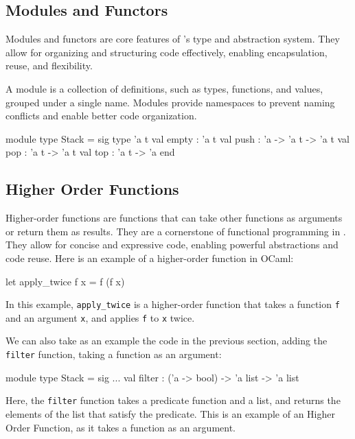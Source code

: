 \subsection{Modules and Functors} %
\label{sub:modules_and_functors}

Modules and functors are core features of \ocaml’s type and abstraction system. 
They allow for organizing and structuring code effectively, enabling encapsulation, 
reuse, and flexibility.

A module is a collection of definitions, such as types, functions, and values, 
grouped under a single name. Modules provide namespaces to prevent naming conflicts 
and enable better code organization.

\begin{ocamlenv}
    module type Stack = sig
        type 'a t
        val empty : 'a t
        val push : 'a -> 'a t -> 'a t
        val pop : 'a t -> 'a t
        val top : 'a t -> 'a
    end
\end{ocamlenv}

\subsection{Higher Order Functions}
\label{sub:higher_order_functions}

Higher-order functions are functions that can take other functions as arguments 
or return them as results. They are a cornerstone of functional programming in \ocaml.
They allow 
for concise and expressive code, enabling powerful abstractions and code reuse. 
Here is an example of a higher-order function in OCaml:

\begin{ocamlenv}
    let apply_twice f x = f (f x)
\end{ocamlenv}

In this example, \texttt{apply\_twice} is a higher-order function that takes a function 
\texttt{f} and an argument \texttt{x}, and applies \texttt{f} to \texttt{x} twice.

We can also take as an example the code in the previous section, adding the \texttt{filter} 
function, taking a function as an argument:

\begin{ocamlenv}
    module type Stack = sig
        ...
        val filter : ('a -> bool) -> 'a list -> 'a list
\end{ocamlenv}

Here, the \texttt{filter} function takes a predicate function and a list, and returns 
the elements of the list that satisfy the predicate. This is an example of an Higher Order 
Function, as it takes a function as an argument.

